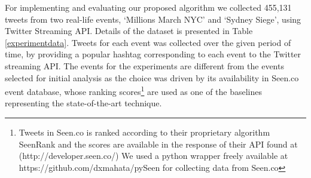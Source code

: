 \begin{table}
\begin{tabular}{|c|c|c|}
\end{tabular}
\end{table}


For implementing and evaluating our proposed algorithm we collected 455,131 tweets from two real-life events, `Millions March NYC' and `Sydney Siege', using Twitter Streaming API. Details of the dataset is presented in Table \ref{experimentdata}.
Tweets for each event was collected over the given period of time, by providing a popular hashtag corresponding to each event to the Twitter streaming API. The events for the experiments are different from the events selected for initial analysis as the choice was driven by its availability in Seen.co event database, whose ranking scores\footnote{\tiny Tweets in Seen.co is ranked according to their proprietary algorithm SeenRank and the scores are available in the response of their API found at (http://developer.seen.co/) We used a python wrapper freely available at https://github.com/dxmahata/pySeen for collecting data from Seen.co} are used as one of the baselines representing the state-of-the-art technique.




